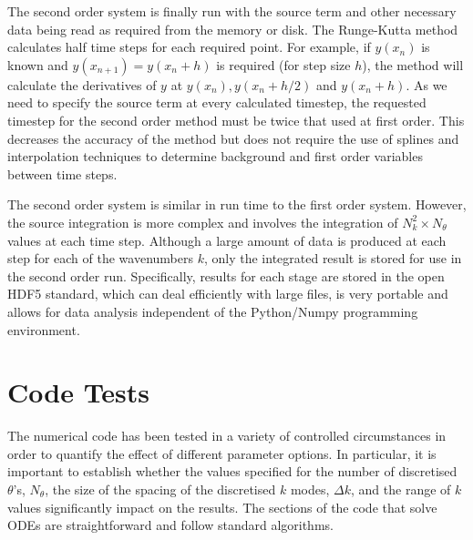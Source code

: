 The second order system is finally run with the source term and other
necessary data being read as required from the memory or disk. The
Runge-Kutta method calculates half time steps for each required point.
For example, if $y(x_n)$ is known and $y(x_{n+1})=y(x_n+h)$ is required
(for step size $h$), the method will calculate the derivatives of $y$
at $y(x_n), y(x_n +h/2)$ and $y(x_n + h)$. As we need to specify the
source term at every calculated timestep, the requested timestep for
the second order method must be twice that used at first order.  This decreases the
accuracy of the method but does not require the use
of splines and interpolation techniques to determine background and
first order variables between time steps.


The second order system is similar in run time to the first order 
system. However, the
source integration is more complex and involves the
integration of $N_k^2\times N_\theta$ values at
each time step.
Although a large amount of data is produced at each step for 
each of the wavenumbers $k$, only the integrated result is stored for use
in the second order run.
Specifically, results for each stage are stored in the open HDF5 standard, which can
deal efficiently with large
files, is very portable and allows for data analysis independent of the
Python/Numpy programming environment.


\section{Code Tests}
\label{sec:tests-num}


The numerical code has been tested in a variety of controlled
circumstances in order to quantify the effect of different parameter options. In
particular, it is important to establish whether the values
specified for the number of discretised $\theta$'s, $N_\theta$, the size
of the
spacing of the discretised $k$ modes, $\Delta k$, and the range of
$k$ values significantly impact on the results. The sections
of the code that solve ODEs are straightforward and follow standard algorithms.


